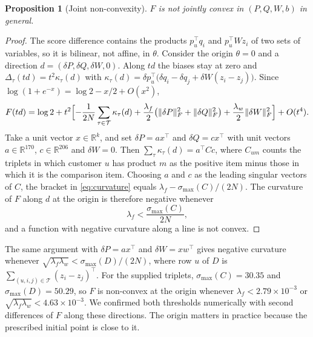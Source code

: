 \documentclass[12pt,a4paper]{article}
\newtheorem{proposition}{Proposition}
\newcommand{\R}{\mathbb{R}}
\newcommand{\norm}[1]{\lVert #1 \rVert}
\begin{document}
\begin{proposition}[Joint non-convexity]
$F$ is not jointly convex in $(P, Q, W, b)$ in general.
\end{proposition}

\begin{proof}
The score difference contains the products $p_u^\top q_i$ and $p_u^\top W
z_i$ of two sets of variables, so it is bilinear, not affine, in $\theta$.
Consider the origin $\theta = 0$ and a direction $d = (\delta P, \delta Q,
\delta W, 0)$. Along $t d$ the biases stay at zero and
$\Delta_\tau(t d) = t^2 \kappa_\tau(d)$ with
$\kappa_\tau(d) = \delta p_u^\top\bigl(\delta q_i - \delta q_j
+ \delta W (z_i - z_j)\bigr)$.
Since $\log(1 + e^{-x}) = \log 2 - x/2 + O(x^2)$,
\begin{equation}
    F(t d) = \log 2 + t^2 \Bigl[ -\frac{1}{2N}\sum_{\tau \in \mathcal{T}} \kappa_\tau(d)
    + \frac{\lambda_f}{2}\bigl(\norm{\delta P}_F^2 + \norm{\delta Q}_F^2\bigr)
    + \frac{\lambda_w}{2}\norm{\delta W}_F^2 \Bigr] + O(t^4).
    \label{eq:curvature}
\end{equation}
Take a unit vector $x \in \R^k$, and set $\delta P = a x^\top$ and
$\delta Q = c x^\top$ with unit vectors $a \in \R^{170}$, $c \in \R^{206}$
and $\delta W = 0$. Then $\sum_\tau \kappa_\tau(d) = a^\top C c$, where
$C_{um}$ counts the triplets in which customer $u$ has product $m$ as the
positive item minus those in which it is the comparison item. Choosing $a$
and $c$ as the leading singular vectors of $C$, the bracket in
\eqref{eq:curvature} equals $\lambda_f - \sigma_{\max}(C)/(2N)$. The curvature
of $F$ along $d$ at the origin is therefore negative whenever
\begin{equation}
    \lambda_f < \frac{\sigma_{\max}(C)}{2N},
    \label{eq:threshold-f}
\end{equation}
and a function with negative curvature along a line is not convex.
\end{proof}

The same argument with $\delta P = a x^\top$ and $\delta W = x w^\top$ gives
negative curvature whenever
$\sqrt{\lambda_f \lambda_w} < \sigma_{\max}(D)/(2N)$, where row $u$ of $D$ is
$\sum_{(u,i,j) \in \mathcal{T}} (z_i - z_j)^\top$. For the supplied triplets,
$\sigma_{\max}(C) = 30.35$ and $\sigma_{\max}(D) = 50.29$, so $F$ is
non-convex at the origin whenever $\lambda_f < 2.79 \times 10^{-3}$ or
$\sqrt{\lambda_f \lambda_w} < 4.63 \times 10^{-3}$. We confirmed both
thresholds numerically with second differences of $F$ along these directions.
The origin matters in practice because the prescribed initial point is close
to it.
\end{document}

